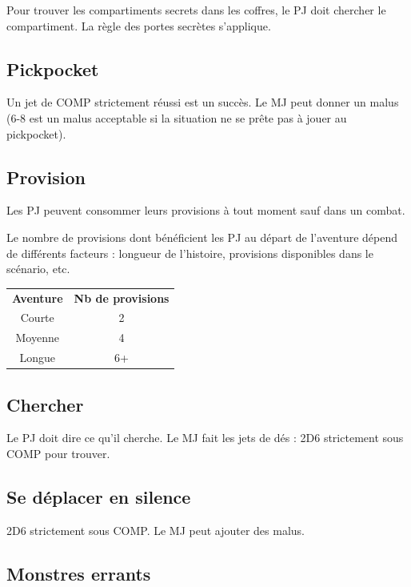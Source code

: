 \documentclass[a4paper, 11pt, twoside]{article}
\begin{document}
Pour trouver les compartiments secrets dans les coffres, le PJ doit chercher le compartiment. La règle des portes secrètes s'applique.

\subsection{Pickpocket}
\label{sec:orgf001333}

Un jet de COMP strictement réussi est un succès. Le MJ peut donner un malus (6-8 est un malus acceptable si la situation ne se prête pas à jouer au pickpocket).

\subsection{Provision}
\label{sec:orgc430b49}

Les PJ peuvent consommer leurs provisions à tout moment sauf dans un combat.

Le nombre de provisions dont bénéficient les PJ au départ de l'aventure dépend de différents facteurs : longueur de l'histoire, provisions disponibles dans le scénario, etc.

\begin{longtable}{cc}
\textbf{Aventure} & \textbf{Nb de provisions}\\
Courte & 2\\
Moyenne & 4\\
Longue & 6+\\
\end{longtable}

\subsection{Chercher}
\label{sec:org00a6814}

Le PJ doit dire ce qu'il cherche. Le MJ fait les jets de dés : 2D6 strictement sous COMP pour trouver.

\subsection{Se déplacer en silence}
\label{sec:org7d23456}

2D6 strictement sous COMP. Le MJ peut ajouter des malus.

\subsection{Monstres errants}
\label{sec:orgd90c98a}
\end{document}
